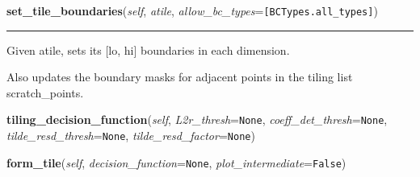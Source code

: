     \label{Tiling:Domain:set_tile_boundaries}

    \vspace{0.5ex}

\hspace{.8\funcindent}\begin{boxedminipage}{\funcwidth}

    \raggedright \textbf{set\_tile\_boundaries}(\textit{self}, \textit{atile}, \textit{allow\_bc\_types}={\tt [BCTypes.all\_types]})

    \vspace{-1.5ex}

    \rule{\textwidth}{0.5\fboxrule}
\setlength{\parskip}{2ex}
    Given atile, sets its [lo, hi] boundaries in each dimension.

    Also updates the boundary masks for adjacent points in the tiling list 
    scratch\_points.

\setlength{\parskip}{1ex}
    \end{boxedminipage}

    \label{Tiling:Domain:tiling_decision_function}

    \vspace{0.5ex}

\hspace{.8\funcindent}\begin{boxedminipage}{\funcwidth}

    \raggedright \textbf{tiling\_decision\_function}(\textit{self}, \textit{L2r\_thresh}={\tt None}, \textit{coeff\_det\_thresh}={\tt None}, \textit{tilde\_resd\_thresh}={\tt None}, \textit{tilde\_resd\_factor}={\tt None})

\setlength{\parskip}{2ex}
\setlength{\parskip}{1ex}
    \end{boxedminipage}

    \label{Tiling:Domain:form_tile}

    \vspace{0.5ex}

\hspace{.8\funcindent}\begin{boxedminipage}{\funcwidth}

    \raggedright \textbf{form\_tile}(\textit{self}, \textit{decision\_function}={\tt None}, \textit{plot\_intermediate}={\tt False})

\setlength{\parskip}{2ex}
\setlength{\parskip}{1ex}
    \end{boxedminipage}

